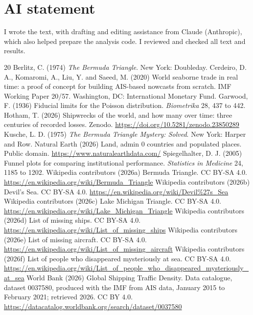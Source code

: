 \documentclass[11pt,a4paper]{article}
\begin{document}
\section*{AI statement}
I wrote the text, with drafting and editing assistance from Claude (Anthropic), which also helped prepare the analysis code. I reviewed and checked all text and results.

\begin{thebibliography}{20}
 Berlitz, C. (1974) \emph{The Bermuda Triangle}. New York: Doubleday.
 Cerdeiro, D. A., Komaromi, A., Liu, Y. and Saeed, M. (2020) World seaborne trade in real time: a proof of concept for building AIS-based nowcasts from scratch. IMF Working Paper 20/57. Washington, DC: International Monetary Fund.
 Garwood, F. (1936) Fiducial limits for the Poisson distribution. \emph{Biometrika} 28, 437 to 442.
 Hotham, T. (2026) Shipwrecks of the world, and how many over time: three centuries of recorded losses. Zenodo. \url{https://doi.org/10.5281/zenodo.23850289}
 Kusche, L. D. (1975) \emph{The Bermuda Triangle Mystery: Solved}. New York: Harper and Row.
 Natural Earth (2026) Land, admin 0 countries and populated places. Public domain. \url{https://www.naturalearthdata.com/}
 Spiegelhalter, D. J. (2005) Funnel plots for comparing institutional performance. \emph{Statistics in Medicine} 24, 1185 to 1202.
 Wikipedia contributors (2026a) Bermuda Triangle. CC BY-SA 4.0. \url{https://en.wikipedia.org/wiki/Bermuda_Triangle}
 Wikipedia contributors (2026b) Devil's Sea. CC BY-SA 4.0. \url{https://en.wikipedia.org/wiki/Devil\%27s_Sea}
 Wikipedia contributors (2026c) Lake Michigan Triangle. CC BY-SA 4.0. \url{https://en.wikipedia.org/wiki/Lake_Michigan_Triangle}
 Wikipedia contributors (2026d) List of missing ships. CC BY-SA 4.0. \url{https://en.wikipedia.org/wiki/List_of_missing_ships}
 Wikipedia contributors (2026e) List of missing aircraft. CC BY-SA 4.0. \url{https://en.wikipedia.org/wiki/List_of_missing_aircraft}
 Wikipedia contributors (2026f) List of people who disappeared mysteriously at sea. CC BY-SA 4.0. \url{https://en.wikipedia.org/wiki/List_of_people_who_disappeared_mysteriously_at_sea}
 World Bank (2026) Global Shipping Traffic Density. Data catalogue, dataset 0037580, produced with the IMF from AIS data, January 2015 to February 2021; retrieved 2026. CC BY 4.0. \url{https://datacatalog.worldbank.org/search/dataset/0037580}
\end{thebibliography}
\end{document}
